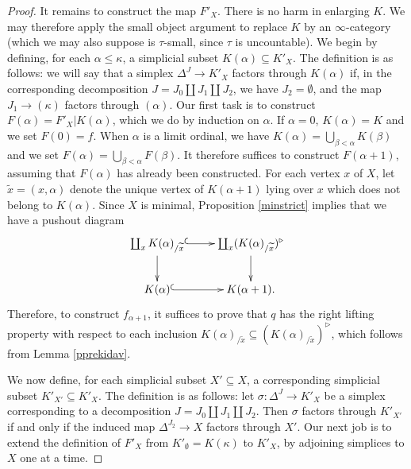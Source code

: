 \begin{proof}
It remains to construct the map $F'_X$. There
is no harm in enlarging $K$. We may therefore apply the small object argument
to replace $K$ by an $\infty$-category (which we may also suppose is $\tau$-small, since $\tau$ is uncountable). We begin by defining, for each $\alpha \leq \kappa$,
a simplicial subset $K(\alpha) \subseteq K'_X$. The definition is as follows: we will say
that a simplex $\Delta^J \rightarrow K'_X$ factors through $K(\alpha)$ if, in the corresponding decomposition $J = J_0 \coprod J_1 \coprod J_2$, we have $J_2 = \emptyset$, and the map
$J_1 \rightarrow (\kappa)$ factors through $(\alpha)$. Our first task is to construct
$F(\alpha) = F'_X | K(\alpha)$, which we do by induction on $\alpha$.
If $\alpha=0$, $K(\alpha) = K$ and we set $F(0) = f$.
When $\alpha$ is a limit ordinal, we have $K(\alpha) = \bigcup_{ \beta < \alpha } K(\beta)$ and we set $F(\alpha) = \bigcup_{\beta < \alpha} F(\beta)$. 
It therefore suffices to construct $F(\alpha+1)$, assuming that $F(\alpha)$ has already been constructed. For each vertex $x$ of $X$, let $\widetilde{x}=(x, \alpha)$ denote the unique vertex of $K(\alpha+1)$ lying over $x$ which does not belong to $K(\alpha)$. Since $X$ is minimal, Proposition \ref{minstrict} implies that we have a pushout diagram
$$ \xymatrix{ \coprod_{x} K(\alpha)_{/\widetilde{x}} \ar@{^{(}->}[r] \ar[d] & \coprod_{x} (K(\alpha)_{/\widetilde{x}})^{\triangleright} \ar[d]  \\
K(\alpha) \ar@{^{(}->}[r] & K(\alpha+1). }$$
Therefore, to construct $f_{\alpha+1}$, it suffices to prove that $q$ has the right lifting property with respect to each inclusion $K(\alpha)_{/\widetilde{x}} \subseteq (K(\alpha)_{/\widetilde{x}})^{\triangleright}$, which follows
from Lemma \ref{pprekidav}.

We now define, for each simplicial subset $X' \subseteq X$, a corresponding simplicial subset
$K'_{X'} \subseteq K'_{X}$. The definition is as follows: let $\sigma: \Delta^J \rightarrow K'_{X}$ be a simplex corresponding to a decomposition $J = J_0 \coprod J_1 \coprod J_2$. Then $\sigma$
factors through $K'_{X'}$ if and only if the induced map $\Delta^{J_2} \rightarrow X$ factors through $X'$. Our next job is to extend the definition of $F'_{X}$ from $K'_{\emptyset} = K(\kappa)$
to $K'_{X}$, by adjoining simplices to $X$ one at a time.


\end{proof}
